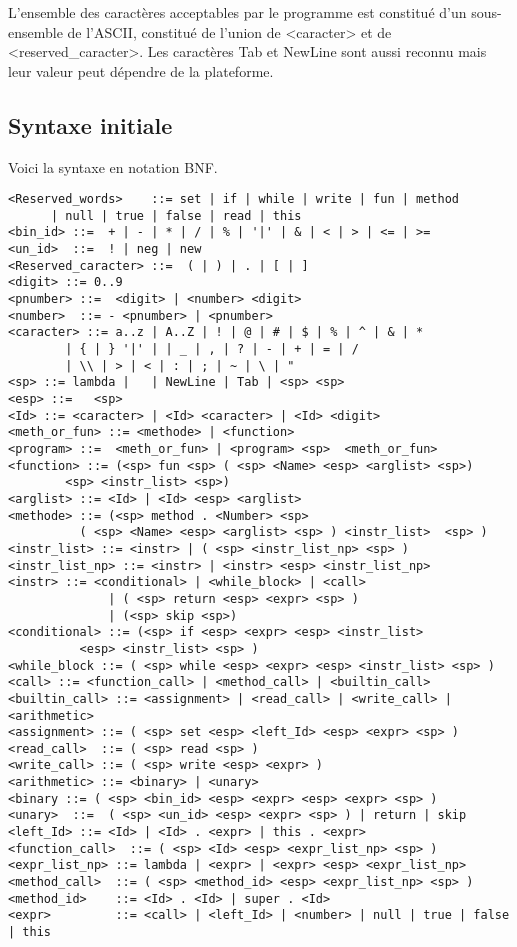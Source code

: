 L'ensemble des caractères acceptables par le programme est constitué d'un sous-ensemble de l'ASCII,
constitué de l'union de <caracter> et de <reserved\_caracter>. Les caractères Tab et NewLine sont aussi
reconnu mais leur valeur peut dépendre de la plateforme. 

\subsection{Syntaxe initiale}
Voici la syntaxe en notation BNF.
\begin{verbatim}
<Reserved_words>    ::= set | if | while | write | fun | method 
      | null | true | false | read | this 
<bin_id> ::=  + | - | * | / | % | '|' | & | < | > | <= | >=
<un_id>  ::=  ! | neg | new
<Reserved_caracter> ::=  ( | ) | . | [ | ]
<digit> ::= 0..9 
<pnumber> ::=  <digit> | <number> <digit> 
<number>  ::= - <pnumber> | <pnumber>
<caracter> ::= a..z | A..Z | ! | @ | # | $ | % | ^ | & | * 
		| { | } '|' | | _ | , | ? | - | + | = | / 
		| \\ | > | < | : | ; | ~ | \ | " 
<sp> ::= lambda |   | NewLine | Tab | <sp> <sp>
<esp> ::=   <sp>
<Id> ::= <caracter> | <Id> <caracter> | <Id> <digit>   
<meth_or_fun> ::= <methode> | <function>
<program> ::=  <meth_or_fun> | <program> <sp>  <meth_or_fun> 
<function> ::= (<sp> fun <sp> ( <sp> <Name> <esp> <arglist> <sp>) 
		<sp> <instr_list> <sp>) 
<arglist> ::= <Id> | <Id> <esp> <arglist>
<methode> ::= (<sp> method . <Number> <sp> 
	      ( <sp> <Name> <esp> <arglist> <sp> ) <instr_list>  <sp> )
<instr_list> ::= <instr> | ( <sp> <instr_list_np> <sp> ) 
<instr_list_np> ::= <instr> | <instr> <esp> <instr_list_np>
<instr> ::= <conditional> | <while_block> | <call> 
			  | ( <sp> return <esp> <expr> <sp> ) 
			  | (<sp> skip <sp>)
<conditional> ::= (<sp> if <esp> <expr> <esp> <instr_list>
		  <esp> <instr_list> <sp> ) 
<while_block ::= ( <sp> while <esp> <expr> <esp> <instr_list> <sp> ) 
<call> ::= <function_call> | <method_call> | <builtin_call> 
<builtin_call> ::= <assignment> | <read_call> | <write_call> | <arithmetic>
<assignment> ::= ( <sp> set <esp> <left_Id> <esp> <expr> <sp> ) 
<read_call>  ::= ( <sp> read <sp> ) 
<write_call> ::= ( <sp> write <esp> <expr> )
<arithmetic> ::= <binary> | <unary>
<binary ::= ( <sp> <bin_id> <esp> <expr> <esp> <expr> <sp> )
<unary>  ::=  ( <sp> <un_id> <esp> <expr> <sp> ) | return | skip
<left_Id> ::= <Id> | <Id> . <expr> | this . <expr>
<function_call>  ::= ( <sp> <Id> <esp> <expr_list_np> <sp> )
<expr_list_np> ::= lambda | <expr> | <expr> <esp> <expr_list_np>
<method_call>  ::= ( <sp> <method_id> <esp> <expr_list_np> <sp> )
<method_id>    ::= <Id> . <Id> | super . <Id> 
<expr>         ::= <call> | <left_Id> | <number> | null | true | false | this  
\end{verbatim}

